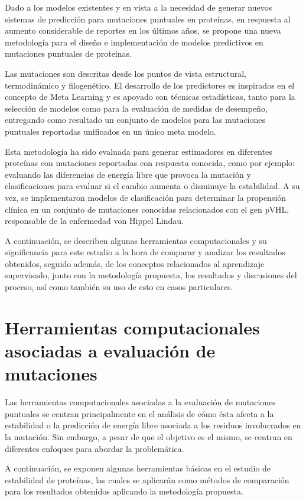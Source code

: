 Dado a los modelos existentes y en vista a la necesidad de generar nuevos sistemas de predicción para mutaciones puntuales en proteínas, en respuesta al aumento considerable de reportes en los últimos años, se propone una nueva metodología para el diseño e implementación de modelos predictivos en mutaciones puntuales de proteínas.

Las mutaciones son descritas desde los puntos de vista estructural, termodinámico y filogenético. El desarrollo de los predictores es inspirados en el concepto de Meta Learning y es apoyado con técnicas estadísticas, tanto para la selección de modelos como para la evaluación de medidas de desempeño, entregando como resultado un conjunto de modelos para las mutaciones puntuales reportadas unificados en un único meta modelo.

Esta metodología ha sido evaluada para generar estimadores en diferentes proteínas con mutaciones reportadas con respuesta conocida, como por ejemplo: evaluando las diferencias de energía libre que provoca la mutación y clasificaciones para evaluar si el cambio aumenta o disminuye la estabilidad. A su vez, se implementaron modelos de clasificación para determinar la propensión clínica en un conjunto de mutaciones conocidas relacionados con el gen \textit{p}VHL, responsable de la enfermedad von Hippel Lindau.

A continuación, se describen algunas herramientas computacionales y su significancia para este estudio a la hora de comparar y analizar los resultados obtenidos, seguido además, de los conceptos relacionados al aprendizaje supervisado, junto con la metodología propuesta, los resultados y discusiones del proceso, así como también su uso de esto en casos particulares.

\section{Herramientas computacionales asociadas a evaluación de mutaciones}

Las herramientas computacionales asociadas a la evaluación de mutaciones puntuales se centran principalmente en el análisis de cómo ésta afecta a la estabilidad o la predicción de energía libre asociada a los residuos involucrados en la mutación. Sin embargo, a pesar de que el objetivo es el mismo, se centran en diferentes enfoques para abordar la problemática.

A continuación, se exponen algunas herramientas básicas en el estudio de estabilidad de proteínas, las cuales se aplicarán como métodos de comparación para los resultados obtenidos aplicando la metodología propuesta.

